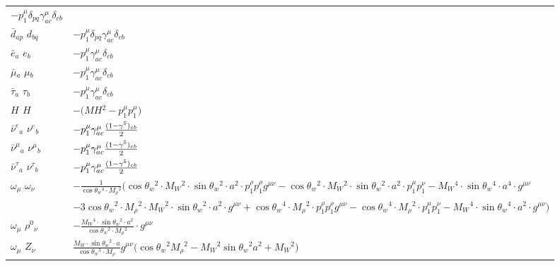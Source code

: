 \begin{center}
\begin{tabular}{|l|l|}
	$-p_1^\mu \delta_{p q} \gamma_{a c}^\mu \delta_{c b} $\\[2mm]
$\bar{d}{}_{a p }$ \phantom{-} $d{}_{b q }$ \phantom{-}  &
	$-p_1^\mu \delta_{p q} \gamma_{a c}^\mu \delta_{c b} $\\[2mm]
$\bar{e}{}_{a }$ \phantom{-} $e{}_{b }$ \phantom{-}  &
	$-p_1^\mu \gamma_{a c}^\mu \delta_{c b} $\\[2mm]
$\bar{\mu}{}_{a }$ \phantom{-} $\mu{}_{b }$ \phantom{-}  &
	$-p_1^\mu \gamma_{a c}^\mu \delta_{c b} $\\[2mm]
$\bar{\tau}{}_{a }$ \phantom{-} $\tau{}_{b }$ \phantom{-}  &
	$-p_1^\mu \gamma_{a c}^\mu \delta_{c b} $\\[2mm]
${H}_{}$ \phantom{-} ${H}_{}$ \phantom{-}  &
	$-\big( MH{}^2 -p_1^\mu p_1^\mu \big)$\\[2mm]
$\bar{\nu}^e{}_{a }$ \phantom{-} $\nu^e{}_{b }$ \phantom{-}  &
	$-p_1^\mu \gamma_{a c}^\mu {(1-\gamma^5)_{c b}\over 2} $\\[2mm]
$\bar{\nu}^\mu{}_{a }$ \phantom{-} $\nu^\mu{}_{b }$ \phantom{-}  &
	$-p_1^\mu \gamma_{a c}^\mu {(1-\gamma^5)_{c b}\over 2} $\\[2mm]
$\bar{\nu}^\tau{}_{a }$ \phantom{-} $\nu^\tau{}_{b }$ \phantom{-}  &
	$-p_1^\mu \gamma_{a c}^\mu {(1-\gamma^5)_{c b}\over 2} $\\[2mm]
$\omega{}_{\mu }$ \phantom{-} $\omega{}_{\nu }$ \phantom{-}  &
	$-\frac{1}{ \cos{\theta}_w{}^4  \cdot M_\rho{}^2 }\big( \cos{\theta}_w{}^2 \cdot  M_W{}^2 \cdot  \sin{\theta}_w{}^2 \cdot  a{}^2 \cdot p_1^\rho p_1^\rho g^{\mu \nu} - \cos{\theta}_w{}^2 \cdot  M_W{}^2 \cdot  \sin{\theta}_w{}^2 \cdot  a{}^2 \cdot p_1^\mu p_1^\nu - M_W{}^4 \cdot  \sin{\theta}_w{}^4 \cdot  a{}^4 \cdot g^{\mu \nu} $ \\[2mm]
  & $-3 \cos{\theta}_w{}^2 \cdot  M_\rho{}^2 \cdot  M_W{}^2 \cdot  \sin{\theta}_w{}^2 \cdot  a{}^2 \cdot g^{\mu \nu} + \cos{\theta}_w{}^4 \cdot  M_\rho{}^2 \cdot p_1^\rho p_1^\rho g^{\mu \nu} - \cos{\theta}_w{}^4 \cdot  M_\rho{}^2 \cdot p_1^\mu p_1^\nu - M_W{}^4 \cdot  \sin{\theta}_w{}^4 \cdot  a{}^2 \cdot g^{\mu \nu} \big)$\\[2mm]
$\omega{}_{\mu }$ \phantom{-} $\rho^0{}_{\nu }$ \phantom{-}  &
	$-\frac{ M_W{}^4  \cdot \sin{\theta}_w{}^2  \cdot a{}^2 }{ \cos{\theta}_w{}^2  \cdot M_\rho{}^2 }\cdot g^{\mu \nu} $\\[2mm]
$\omega{}_{\mu }$ \phantom{-} ${Z}_{\nu }$ \phantom{-}  &
	$\frac{ M_W \cdot \sin{\theta}_w{}^2  \cdot a}{ \cos{\theta}_w{}^3  \cdot M_\rho}g^{\mu \nu} \big( \cos{\theta}_w{}^2  M_\rho{}^2 - M_W{}^2  \sin{\theta}_w{}^2  a{}^2 + M_W{}^2 \big)$\\[2mm]

\end{tabular}
\end{center}
